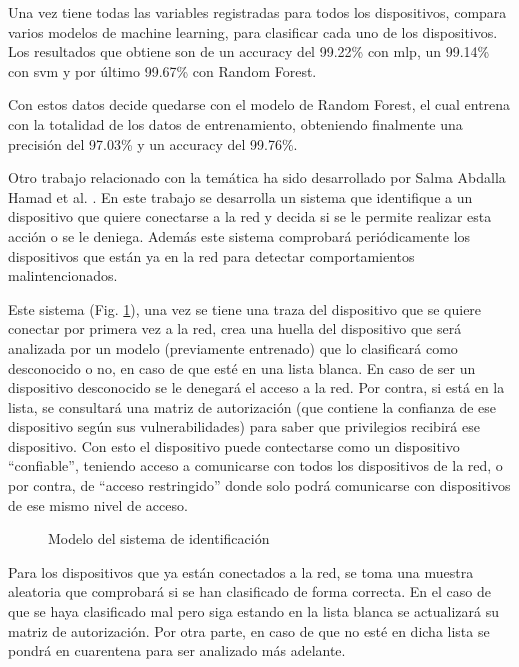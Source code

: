 Una vez tiene todas las variables registradas para todos los dispositivos, compara varios modelos de machine learning, para clasificar cada uno de los dispositivos. Los resultados que obtiene son de un accuracy del 99.22\% con \acrshort{mlp}, un 99.14\% con \acrshort{svm} y por último 99.67\% con Random Forest.

Con estos datos decide quedarse con el modelo de Random Forest, el cual entrena con la totalidad de los datos de entrenamiento, obteniendo finalmente una precisión del 97.03\% y un accuracy del 99.76\%.

Otro trabajo relacionado con la temática ha sido desarrollado por Salma Abdalla Hamad et al. \cite{hamad2019iot}. En este trabajo se desarrolla un sistema que identifique a un dispositivo que quiere conectarse a la red y decida si se le permite realizar esta acción o se le deniega. Además este sistema comprobará periódicamente los dispositivos que están ya en la red para detectar comportamientos malintencionados. 

Este sistema (Fig. \ref{fig:diam_hamad}), una vez se tiene una traza del dispositivo que se quiere conectar por primera vez a la red, crea una huella del dispositivo que será analizada por un modelo (previamente entrenado) que lo clasificará como desconocido o no, en caso de que esté en una lista blanca. En caso de ser un dispositivo desconocido se le denegará el acceso a la red. Por contra, si está en la lista, se consultará una matriz de autorización (que contiene la confianza de ese dispositivo según sus vulnerabilidades) para saber que privilegios recibirá ese dispositivo. Con esto el dispositivo puede contectarse como un dispositivo ``confiable'', teniendo acceso a comunicarse con todos los dispositivos de la red, o por contra, de ``acceso restringido'' donde solo podrá comunicarse con dispositivos de ese mismo nivel de acceso.

\begin{figure}[htpb!]
    \centering
    \resizebox{0.6\textwidth}{!}{
        
    }
    \caption{Modelo del sistema de identificación \cite{hamad2019iot}}
    \label{fig:diam_hamad}
\end{figure}

Para los dispositivos que ya están conectados a la red, se toma una muestra aleatoria que comprobará si se han clasificado de forma correcta. En el caso de que se haya clasificado mal pero siga estando en la lista blanca se actualizará su matriz de autorización. Por otra parte, en caso de que no esté en dicha lista se pondrá en cuarentena para ser analizado más adelante.

